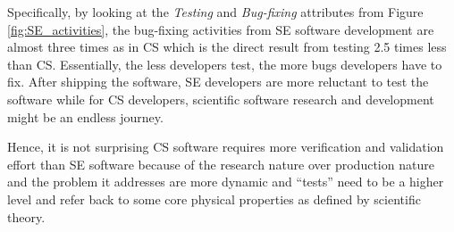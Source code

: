 \documentclass[sigconf,review,anonymous]{acmart}
\newcommand{\ei}{\end{itemize}}
\begin{document}
Specifically, by looking at the \textit{Testing} and \textit{Bug-fixing} attributes from Figure \ref{fig:SE_activities}, the bug-fixing activities from SE software development are almost three times as in CS which is the direct result from testing 2.5 times less than CS. Essentially, the less developers test, the more bugs developers have to fix. After shipping the software, SE developers are more reluctant to test the software while for CS developers, scientific software research and development might be an endless journey.

Hence, it is not surprising CS software requires more verification and validation effort than SE software because of the research nature over production nature and the problem it addresses are more dynamic and  ``tests'' need to be a higher level and refer back to some core physical properties as defined
by scientific theory.  




 

 

\end{document}
